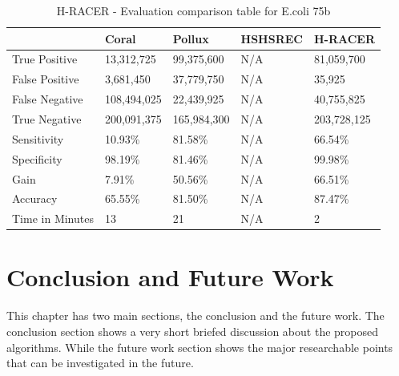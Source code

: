 \documentclass[12pt,openany]{llncs}
\newcommand{\TBstrut}{{\rule{0pt}{7ex}}{\rule[2ex]{0pt}{0pt}}} %
\begin{document}
\begin{longtable}{|m{33mm}|m{20mm}|m{20mm}|m{20mm}|m{20mm}|}
        \caption{\label{tab:eval-4}H-RACER - Evaluation comparison table for E.coli 75b}\\
        \hline
           & Coral & Pollux & HSHSREC & H-RACER\cellcolor{DarkGray} \TBstrut\\ %
        \hline
           True Positive & 13,312,725 & 99,375,600 & N/A & 81,059,700\cellcolor{LightGray} \TBstrut\\ %
        \hline
           False Positive & 3,681,450 & 37,779,750 & N/A & 35,925\cellcolor{LightGray} \TBstrut\\ %
        \hline
           False Negative & 108,494,025 & 22,439,925 & N/A & 40,755,825\cellcolor{LightGray} \TBstrut\\ %
        \hline
           True Negative & 200,091,375 & 165,984,300 & N/A & 203,728,125\cellcolor{LightGray} \TBstrut\\ %
        \hline
           Sensitivity & 10.93\% & 81.58\% & N/A & 66.54\%\cellcolor{LightGray} \TBstrut\\ %
        \hline
           Specificity & 98.19\% & 81.46\% & N/A & 99.98\%\cellcolor{LightGray} \TBstrut\\ %
        \hline
           Gain & 7.91\% & 50.56\% & N/A & 66.51\%\cellcolor{LightGray} \TBstrut\\ %
        \hline
           Accuracy & 65.55\% & 81.50\% & N/A & 87.47\%\cellcolor{LightGray} \TBstrut\\ %
        \hline
           Time in Minutes& 13 & 21 & N/A & 2\cellcolor{LightGray} \TBstrut\\ %
        \hline
\end{longtable}

\newpage
\chapter{\label{chap:7}Conclusion and Future Work}
This chapter has two main sections, the conclusion and the future work. The conclusion section shows a very short briefed discussion about the proposed algorithms. While the future work section shows the major researchable points that can be investigated in the future.
\end{document}
